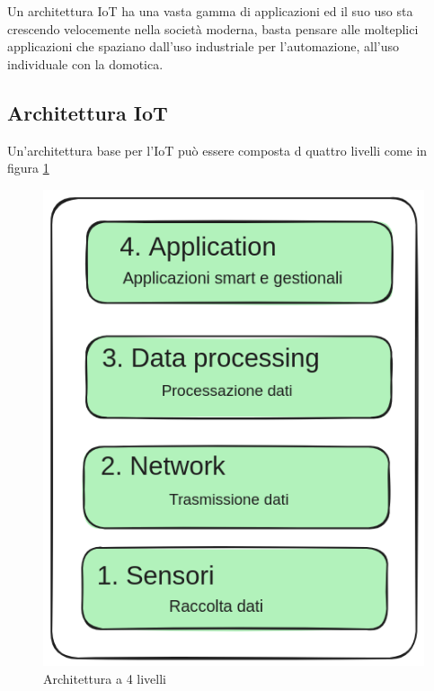 Un architettura IoT ha una vasta gamma di applicazioni ed il suo uso 
sta crescendo velocemente nella società moderna, basta pensare alle
molteplici applicazioni che spaziano dall'uso industriale
per l'automazione, all'uso individuale con la domotica.

\subsection{Architettura IoT}

Un'architettura base per l'IoT può essere composta d quattro
livelli come in figura \ref{fig:architettura_iot}

\begin{figure}[!htp]
    \centering
    \includegraphics[keepaspectratio=true,scale=0.3]{images/architettura_iot.png}
	\caption{Architettura a 4 livelli}
  	\label{fig:architettura_iot}
\end{figure}

